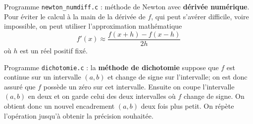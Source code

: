 \documentclass{exam}
\begin{document}
\begin{questions}

\question
Programme \texttt{newton\_numdiff.c} : méthode de Newton avec {\bf dérivée numérique}.\\
Pour éviter le calcul à la main de la dérivée de $f$, qui peut s'avérer difficile, voire impossible, on peut utiliser l'approximation mathématique 
\begin{equation}
\label{numdiff}
f'(x) \approx \frac{f(x+h) - f(x-h)}{2h}
\end{equation}
 où $h$ est un réel positif fixé.




\question
Programme \texttt{dichotomie.c} : la {\bf méthode de dichotomie} suppose que $f$ est continue sur un intervalle $(a, b)$ et change de signe sur l'intervalle; on est donc assuré que $f$ possède un zéro sur cet intervalle. Ensuite on coupe l'intervalle $(a, b)$ en deux et on garde celui des deux intervalles où $f$ change de signe. On obtient donc un nouvel encadrement $(a, b)$ deux fois plus petit. On répète l'opération jusqu'à obtenir la précision souhaitée.
\begin{parts}

\end{parts}
\end{questions}
\end{document}
